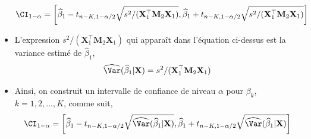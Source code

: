 \begin{frame}[allowframebreaks]
\begin{itemize}
\begin{align*}
\CI_{1-\alpha} = \left[\widehat{\beta}_1 - t_{n-K, 1-\alpha/2}\sqrt{s^2/(\mathbf{X}_1^\top\mathbf{M}_2\mathbf{X}_1)}, 
\widehat{\beta}_1 + t_{n-K, 1-\alpha/2}\sqrt{s^2/(\mathbf{X}_1^\top\mathbf{M}_2\mathbf{X}_1)}\right]
\end{align*}
\item L'expression $s^2/(\mathbf{X}_1^\top\mathbf{M}_2\mathbf{X}_1)$ qui apparaît dans l'équation ci-dessus est la variance estimé de $\widehat{\beta}_1$,
\begin{align*}
\widehat{\Var}(\widehat{\beta}_1| \mathbf{X}) = s^2/(\mathbf{X}_1^\top\mathbf{M}_2\mathbf{X}_1)
\end{align*}
\item Ainsi, on construit un intervalle de confiance de niveau $\alpha$ pour $\beta_k$, $k=1, 2,...,K$, comme suit,
\begin{align}
\CI_{1-\alpha} = \left[\widehat{\beta}_1 - t_{n-K, 1-\alpha/2}\sqrt{\widehat{\Var}(\widehat{\beta}_1| \mathbf{X})}, 
\widehat{\beta}_1 + t_{n-K, 1-\alpha/2}\sqrt{\widehat{\Var}(\widehat{\beta}_1| \mathbf{X})}\right]
\label{eq27}
\end{align}
\end{itemize}
\end{frame}
